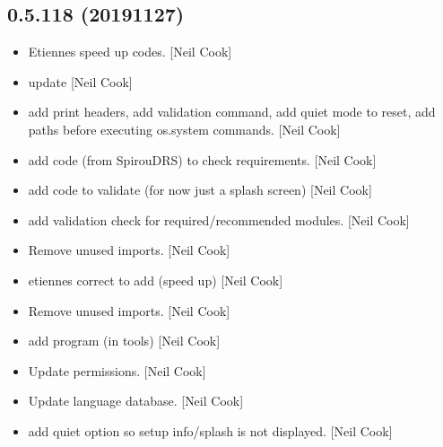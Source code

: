 \documentclass[a4paper,10pt,english]{report}
\begin{document}
\subsection{0.5.118 (2019\sphinxhyphen{}11\sphinxhyphen{}27)}
\label{\detokenize{misc/changelog:id43}}\begin{itemize}
\item {} 
Etiennes speed up codes. {[}Neil Cook{]}

\item {} 
 \sphinxhyphen{} update  {[}Neil Cook{]}

\item {} 
 \sphinxhyphen{} add print headers, add
validation command, add quiet mode to reset, add paths before
executing os.system commands. {[}Neil Cook{]}

\item {} 
 \sphinxhyphen{} add code (from SpirouDRS) to check
requirements. {[}Neil Cook{]}

\item {} 
 \sphinxhyphen{} add code to validate (for now just a splash
screen) {[}Neil Cook{]}

\item {} 
 \sphinxhyphen{} add validation check for required/recommended
modules. {[}Neil Cook{]}

\item {} 
Remove unused imports. {[}Neil Cook{]}

\item {} 
 \sphinxhyphen{} etiennes correct to
add (speed up) {[}Neil Cook{]}

\item {} 
Remove unused imports. {[}Neil Cook{]}

\item {} 
 \sphinxhyphen{} add 
program (in tools) {[}Neil Cook{]}

\item {} 
Update permissions. {[}Neil Cook{]}

\item {} 
Update language database. {[}Neil Cook{]}

\item {} 
 \sphinxhyphen{} add quiet option so setup info/splash is not
displayed. {[}Neil Cook{]}


\end{itemize}
\end{document}
